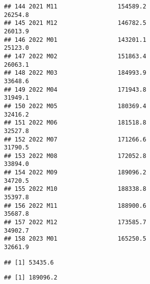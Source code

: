 \documentclass[
]{article}
\newenvironment{Shaded}{\begin{snugshade}}{\end{snugshade}}
\newcommand{\AttributeTok}[1]{\textcolor[rgb]{0.77,0.63,0.00}{#1}}
\newcommand{\DocumentationTok}[1]{\textcolor[rgb]{0.56,0.35,0.01}{\textbf{\textit{#1}}}}
\newcommand{\FunctionTok}[1]{\textcolor[rgb]{0.00,0.00,0.00}{#1}}
\newcommand{\NormalTok}[1]{#1}
\newcommand{\OtherTok}[1]{\textcolor[rgb]{0.56,0.35,0.01}{#1}}
\newcommand{\SpecialCharTok}[1]{\textcolor[rgb]{0.00,0.00,0.00}{#1}}
\newcommand{\StringTok}[1]{\textcolor[rgb]{0.31,0.60,0.02}{#1}}
\begin{document}
\begin{verbatim}
## 144 2021 M11                 154589.2                         26254.8
## 145 2021 M12                 146782.5                         26013.9
## 146 2022 M01                 143201.1                         25123.0
## 147 2022 M02                 151863.4                         26063.1
## 148 2022 M03                 184993.9                         33648.6
## 149 2022 M04                 171943.8                         31949.1
## 150 2022 M05                 180369.4                         32416.2
## 151 2022 M06                 181518.8                         32527.8
## 152 2022 M07                 171266.6                         31790.5
## 153 2022 M08                 172052.8                         33894.0
## 154 2022 M09                 189096.2                         34720.5
## 155 2022 M10                 188338.8                         35397.8
## 156 2022 M11                 188900.6                         35687.8
## 157 2022 M12                 173585.7                         34902.7
## 158 2023 M01                 165250.5                         32661.9
\end{verbatim}

\begin{Shaded}
\end{Shaded}

\begin{verbatim}
## [1] 53435.6
\end{verbatim}

\begin{Shaded}
\end{Shaded}

\begin{verbatim}
## [1] 189096.2
\end{verbatim}
\end{document}
